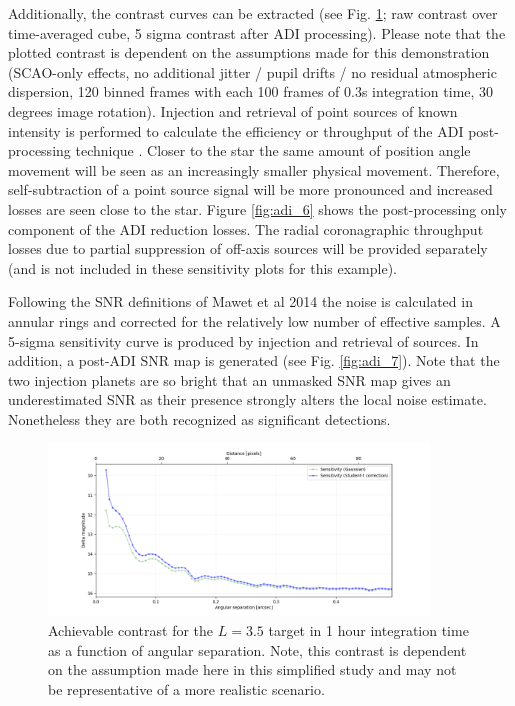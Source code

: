 Additionally, the contrast curves can be extracted (see Fig. \ref{fig:adi_5}; raw contrast over time-averaged cube, 5 sigma contrast after ADI processing). Please note that the plotted contrast is dependent on the assumptions made for this demonstration (SCAO-only effects, no additional jitter / pupil drifts / no residual atmospheric dispersion, 120 binned frames with each 100 frames of 0.3s integration time, 30 degrees image rotation). 
Injection and retrieval of point sources of known intensity is performed to calculate the efficiency or throughput of the ADI post-processing technique . Closer to the star the same amount of position angle movement will be seen as an increasingly smaller physical movement. Therefore, self-subtraction of a point source signal will be more pronounced and increased losses are seen close to the star. Figure \ref{fig:adi_6} shows the post-processing only component of the ADI reduction losses. The radial coronagraphic throughput losses due to partial suppression of off-axis sources will be provided separately (and is not included in these sensitivity plots for this example).

Following the SNR definitions of Mawet et al 2014 the noise is calculated in annular rings and corrected for the relatively low number of effective samples. A 5-sigma sensitivity curve is produced by injection and retrieval of sources. In addition, a post-ADI SNR map is generated (see Fig. \ref{fig:adi_7}). Note that the two injection planets are so bright that an unmasked SNR map gives an underestimated SNR as their presence strongly alters the local noise estimate. Nonetheless they are both recognized as significant detections.

\begin{figure}[!ht]
  \centering
  \includegraphics[width=0.9\textwidth]{./figures/adi_contrast.png}
  \caption[Achievable contrast in 1 hour integration time]{Achievable contrast for the $L=3.5$ target in 1 hour integration time as a function of angular separation. Note, this contrast is dependent on the assumption made here in this simplified study and may not be representative of a more realistic scenario.}
  \label{fig:adi_5}
\end{figure}


